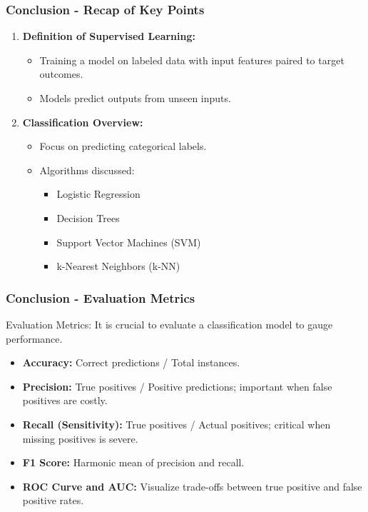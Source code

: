\documentclass[aspectratio=169]{beamer}
\begin{document}
\begin{frame}[fragile]
    \frametitle{Conclusion - Recap of Key Points}
    \begin{enumerate}
        \item \textbf{Definition of Supervised Learning:}
        \begin{itemize}
            \item Training a model on labeled data with input features paired to target outcomes.
            \item Models predict outputs from unseen inputs.
        \end{itemize}
        
        \item \textbf{Classification Overview:}
        \begin{itemize}
            \item Focus on predicting categorical labels.
            \item Algorithms discussed: 
                \begin{itemize}
                    \item Logistic Regression
                    \item Decision Trees
                    \item Support Vector Machines (SVM)
                    \item k-Nearest Neighbors (k-NN)
                \end{itemize}
        \end{itemize}
    \end{enumerate}
\end{frame}

\begin{frame}[fragile]
    \frametitle{Conclusion - Evaluation Metrics}
    \begin{block}{Evaluation Metrics:}
        It is crucial to evaluate a classification model to gauge performance.
        \begin{itemize}
            \item \textbf{Accuracy:} Correct predictions / Total instances.
            \item \textbf{Precision:} True positives / Positive predictions; important when false positives are costly.
            \item \textbf{Recall (Sensitivity):} True positives / Actual positives; critical when missing positives is severe.
            \item \textbf{F1 Score:} Harmonic mean of precision and recall.
            \item \textbf{ROC Curve and AUC:} Visualize trade-offs between true positive and false positive rates.
        \end{itemize}
    \end{block}
\end{frame}
\end{document}
